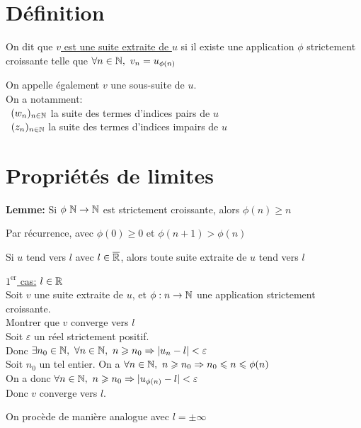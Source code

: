 \documentclass[12pt,twoside,a4paper]{article}
\author{MPSI 2}
\begin{document}
	\maketitle
	\section{Définition}
		\begin{defi}
			On dit que \underline{$v$ est une suite extraite de $u$} si il existe une application $\phi$ strictement croissante telle que $\forall n\in\mathbb{N},\ v_n=u_{\phi(n)}$
		\end{defi}
		\begin{flushleft}
			On appelle également $v$ une sous-suite de $u$.\\
			On a notamment:\\
			\textbullet\ $(w_n)_{n\in\mathbb{N}}$ la suite des termes d'indices pairs de $u$\\
			\textbullet\ $(z_n)_{n\in\mathbb{N}}$ la suite des termes d'indices impairs de $u$
		\end{flushleft}
	\section{Propriétés de limites}
		\begin{prop}
			\textbf{Lemme:} Si $\phi\ \N\rightarrow\N$ est strictement croissante, alors $\phi(n)\geqslant n$
		\end{prop}
		\begin{preuve}
			Par récurrence, avec $\phi(0)\geqslant 0$ et $\phi(n+1)>\phi(n)$
		\end{preuve}
		\begin{prop}
			Si $u$ tend vers $l$ avec $l\in\overline{\mathbb{R}}$, alors toute suite extraite de $u$ tend vers $l$
		\end{prop}
		\begin{preuve}
			\begin{liste}
				\item[\cercle1] \underline{$1^{\text{er}}$ cas:} $l\in\mathbb{R}$\\
					Soit $v$ une suite extraite de $u$, et $\phi : n\rightarrow\mathbb{N}$ une application strictement croissante.\\
					Montrer que $v$ converge vers $l$\\
					Soit $\varepsilon$ un réel strictement positif.\\
					Donc $\exists n_0\in\N,\ \forall n\in\N,\ n\geqslant n_0\Rightarrow |u_n-l|<\varepsilon$\\
					Soit $n_0$ un tel entier. On a $\forall n\in\N,\ n\geqslant n_0\Rightarrow n_0\leqslant n\leqslant\phi(n)$\\
					On a donc $\forall n\in\mathbb{N},\ n\geqslant n_0\Rightarrow |u_{\phi(n)}-l|<\varepsilon$\\
					Donc $v$ converge vers $l$.
				\item[\cercle2]On procède de manière analogue avec $l=\pm\infty$
			\end{liste}
		\end{preuve}
\end{document}
